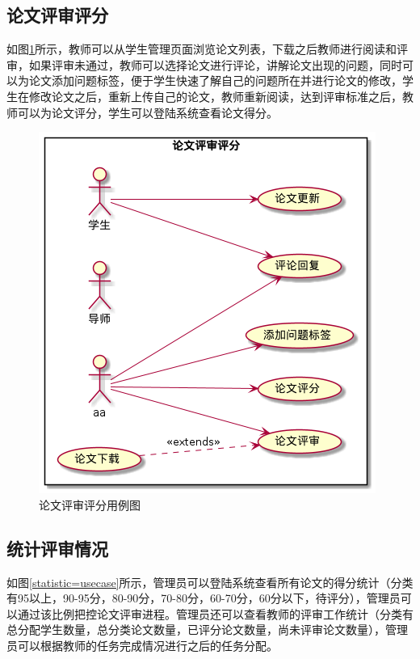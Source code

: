 \subsection{论文评审评分}

如图\ref{scoring-usecase}所示，教师可以从学生管理页面浏览论文列表，下载之后教师进行阅读和评审，如果评审未通过，教师可以选择论文进行评论，讲解论文出现的问题，同时可以为论文添加问题标签，便于学生快速了解自己的问题所在并进行论文的修改，学生在修改论文之后，重新上传自己的论文，教师重新阅读，达到评审标准之后，教师可以为论文评分，学生可以登陆系统查看论文得分。

\begin{figure}[htbp]
    \centering
    \includegraphics[scale = 0.6]{out/uml/用例图/3-论文评审评分/3-论文评审评分.png}
    \caption{\song\wuhao 论文评审评分用例图}
    \label{scoring-usecase}
\end{figure}

\subsection{统计评审情况}

如图\ref{statistic=usecase}所示，管理员可以登陆系统查看所有论文的得分统计（分类有95以上，90-95分，80-90分，70-80分，60-70分，60分以下，待评分），管理员可以通过该比例把控论文评审进程。管理员还可以查看教师的评审工作统计（分类有总分配学生数量，总分类论文数量，已评分论文数量，尚未评审论文数量），管理员可以根据教师的任务完成情况进行之后的任务分配。

